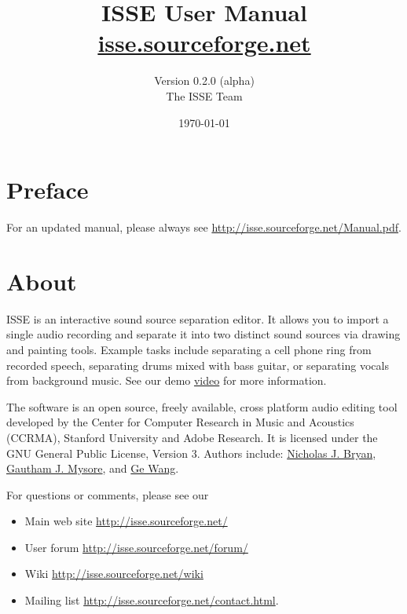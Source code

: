 \documentclass[11pt]{article}
\title{{ISSE User Manual} \\ \vspace{0cm} \url{isse.sourceforge.net} \\ \vspace{13cm}}
\author{Version 0.2.0 (alpha) \\ The ISSE Team }
\date{\today}                                           %
\begin{document}
\maketitle

\newpage

\section*{Preface}
For an updated manual, please always see \textcolor{blue}{\url{http://isse.sourceforge.net/Manual.pdf}}.



\section{About}
ISSE is an interactive sound source separation editor.  It allows you to  import a single audio recording and separate it into two distinct sound sources via drawing and painting tools.  Example tasks include separating a cell  phone ring from recorded speech, separating drums mixed with bass guitar,  or separating vocals from background music. See our demo \textcolor{blue}{\href{http://isse.sourceforge.net/index.html}{video}} for more  information.

The software is an open source, freely available, cross platform audio editing tool developed by the Center for Computer Research in Music and Acoustics (CCRMA), Stanford University and Adobe Research. It is licensed under the GNU General Public License, Version 3. Authors include: \textcolor{blue}{\href{http://ccrma.stanford.edu/~njb}{Nicholas J. Bryan}}, \textcolor{blue}{\href{http://ccrma.stanford.edu/~gautham}{Gautham J. Mysore}}, and  \textcolor{blue}{\href{http://ccrma.stanford.edu/~ge}{Ge Wang}}.

For questions or comments, please see our
\begin{itemize}
\item Main web site  \textcolor{blue}{\url{http://isse.sourceforge.net/}}
\item User forum  \textcolor{blue}{\url{http://isse.sourceforge.net/forum/}}
\item Wiki  \textcolor{blue}{\url{http://isse.sourceforge.net/wiki}}
\item Mailing list  \textcolor{blue}{\url{http://isse.sourceforge.net/contact.html}}.
\end{itemize}
\end{document}
